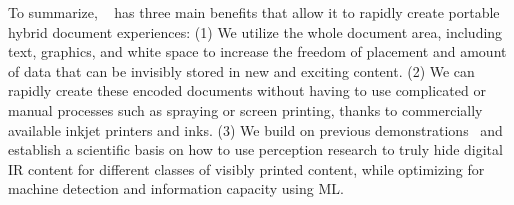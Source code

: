 \vspace{0.2cm}
To summarize, %
\systemName~ has three main benefits that allow it to rapidly create portable %
hybrid document experiences:
(1) We utilize the whole document area, including text, graphics, and white space to increase the freedom of placement and amount of data that can be invisibly stored in new and exciting content. %
(2) We can rapidly create these encoded documents without having to use complicated or manual processes such as spraying or screen printing, thanks to commercially available inkjet printers and inks.
(3) We build on previous demonstrations~\cite{dogan_standarone_2023} and establish a scientific basis on how to use perception research to truly hide digital IR content for different classes of visibly printed content, while optimizing for machine detection and information capacity using ML.